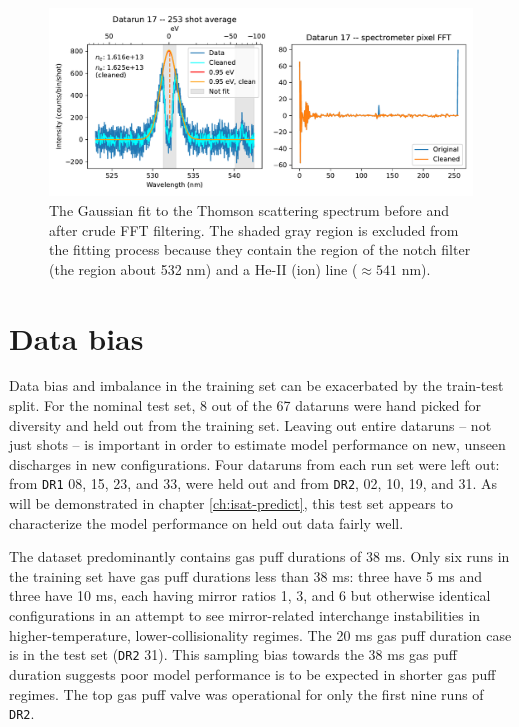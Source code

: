 \begin{figure}
	\centering
	\includegraphics[width=\linewidth]{figures/TS_fit-and-FFT.pdf}
	\caption[Cleaning Thomson scattering spectra]{\label{fig:TS_fit-and-FFT} The Gaussian fit to the Thomson scattering spectrum before and after crude FFT filtering. The shaded gray region is excluded from the fitting process because they contain the region of the notch filter (the region about 532 nm) and a He-II (ion) line ($\approx 541$ nm).}
\end{figure}


\section{Data bias \label{sec:app_bias}}

Data bias and imbalance in the training set can be exacerbated by the train-test split. For the nominal test set, 8 out of the 67 dataruns were hand picked for diversity and held out from the training set. Leaving out entire dataruns -- not just shots -- is important in order to estimate model performance on new, unseen discharges in new configurations. Four dataruns from each run set were left out: from \texttt{DR1} 08, 15, 23, and 33, were held out and from \texttt{DR2}, 02, 10, 19, and 31. As will be demonstrated in chapter \ref{ch:isat-predict}, this test set appears to characterize the model performance on held out data fairly well.

The dataset predominantly contains gas puff durations of 38 ms. Only six runs in the training set have gas puff durations less than 38 ms: three have 5 ms and three have 10 ms, each having mirror ratios 1, 3, and 6 but otherwise identical configurations in an attempt to see mirror-related interchange instabilities in higher-temperature, lower-collisionality regimes. The 20 ms gas puff duration case is in the test set (\texttt{DR2} 31). This sampling bias towards the 38 ms gas puff duration suggests poor model performance is to be expected in shorter gas puff regimes. The top gas puff valve was operational for only the first nine runs of \texttt{DR2}.

